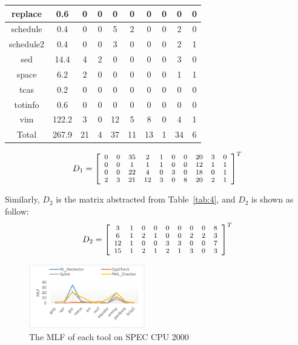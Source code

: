 \begin{table}[!h]
\begin{tabular}{|c|c|c|c|c|c|c|c|c|c|}
\hline
replace    & 0.6   & 0	& 0	  & 0    & 0  & 0	 & 0	   & 0   & 0\\
\hline
schedule  & 0.4	& 0	& 0	  & 5    & 2  & 0	 & 0	   & 2   & 0\\
\hline
schedule2 & 0.4	& 0	& 0    & 3    & 0  & 0	 & 0	   & 2   & 1\\
\hline
sed	        & 14.4	& 4	& 2    &	0   & 0  & 0	 & 0	   & 3   & 0\\
\hline
space	 & 6.2	& 2	& 0	   & 0   & 0  & 0	 & 0	   & 1   & 1\\
\hline
tcas	       & 0.2	& 0	& 0    &	0   & 0  & 0	 & 0    & 0   & 0\\
\hline
totinfo	 & 0.6	& 0  & 0	   & 0    & 0  & 0	 & 0	   & 0   & 0\\
\hline
vim        & 122.2	& 3	& 0	   & 12  & 5  & 8	 & 0	   & 4   & 1\\
\hline
Total	 & 267.9	 & 21&4	   & 37  & 11 & 13 & 1   & 34  & 6\\
\hline
\end{tabular}
\end{table}

\[
\scriptsize
D_1=\left[
\begin{array}{cccccccccc}
0 & 0 & 35 & 2 & 1 & 0 & 0 & 20 & 3 & 0\\
0 & 0 & 1  &  1 & 1 & 0 & 0 & 12 & 1 & 1\\
0 & 0 & 22 & 4 & 0 & 3 & 0 & 18 & 0 & 1 \\
2 & 3 & 21 & 12 & 3& 0 & 8 & 20 & 2 & 1  
\end{array}
\right]^{T}
\]

Similarly, $D_2$ is the matrix abstracted from Table~\ref{tab:4}, and $D_2$ is shown as follow:
\[
\scriptsize
D_2=\left[
\begin{array}{ccccccccc}
3 & 1 & 0 & 0 & 0 & 0 & 0 & 0 & 8 \\
6 & 1 & 2 &  1 & 0 & 0 & 2 & 2 & 3\\
12 & 1 & 0 & 0 & 3 & 3 & 0 & 0 & 7 \\
15 & 1 & 2& 1 & 2 & 1 & 3 & 0 & 3  
\end{array}
\right]^{T}
\]

\begin{figure}[!h]
\center
\includegraphics[width=0.45\textwidth]{figure/fig8-fig12/fig10}
\caption{The MLF of each tool on SPEC CPU 2000}
\label{fig:10}
\end{figure}

